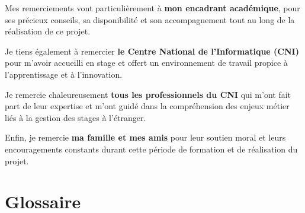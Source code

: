 \documentclass[12pt,a4paper]{report}
\begin{document}
Mes remerciements vont particulièrement à \textbf{mon encadrant académique}, pour ses précieux conseils, sa disponibilité et son accompagnement tout au long de la réalisation de ce projet.

Je tiens également à remercier \textbf{le Centre National de l'Informatique (CNI)} pour m'avoir accueilli en stage et offert un environnement de travail propice à l'apprentissage et à l'innovation.

Je remercie chaleureusement \textbf{tous les professionnels du CNI} qui m'ont fait part de leur expertise et m'ont guidé dans la compréhension des enjeux métier liés à la gestion des stages à l'étranger.

Enfin, je remercie \textbf{ma famille et mes amis} pour leur soutien moral et leurs encouragements constants durant cette période de formation et de réalisation du projet.

\tableofcontents

\listoffigures
{}

\listoftables
{}

\chapter*{Glossaire}
\end{document}
